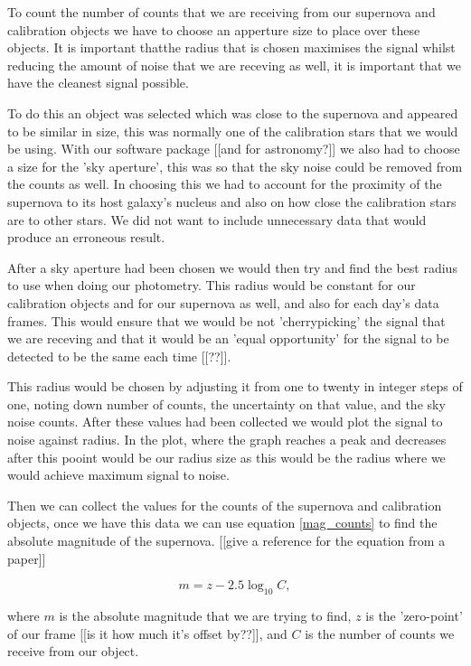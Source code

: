 \documentclass[twocolumn]{revtex4}
\begin{document}
To count the number of counts that we are receiving from our supernova and calibration objects we have to choose an apperture size to place over these objects. It is important thatthe radius that is chosen maximises the signal whilst reducing the amount of noise that we are receving as well, it is important that we have the cleanest signal possible.

To do this an object was selected which was close to the supernova and appeared to be similar in size, this was normally one of the calibration stars that we would be using. With our software package [[and for astronomy?]] we also had to choose a size for the 'sky aperture', this was so that the sky noise could be removed from the counts as well. In choosing this we had to account for the proximity of the supernova to its host galaxy's nucleus and also on how close the calibration stars are to other stars. We did not want to include unnecessary data that would produce an erroneous result. 

After a sky aperture had been chosen we would then try and find the best radius to use when doing our photometry. This radius would be constant for our calibration objects and for our supernova as well, and also for each day's data frames. This would ensure that we would be not 'cherrypicking' the signal that we are receving and that it would be an 'equal opportunity' for the signal to be detected to be the same each time [[??]]. 

This radius would be chosen by adjusting it from one to twenty in integer steps of one, noting down number of counts, the uncertainty on that value, and the sky noise counts. After these values had been collected we would plot the signal to noise against radius. In the plot, where the graph reaches a peak and decreases after this pooint would be our radius size as this would be the radius where we would achieve maximum signal to noise.

Then we can collect the values for the counts of the supernova and calibration objects, once we have this data we can use equation \ref{mag_counts} to find the absolute magnitude of the supernova. [[give a reference for the equation from a paper]]

\begin{equation}
    m = z - 2.5 \log_{10}{C},
\label{mag_counts}
\end{equation}

where $m$ is the absolute magnitude that we are trying to find, $z$ is the 'zero-point' of our frame [[is it how much it's offset by??]], and $C$ is the number of counts we receive from our object.
\end{document}
